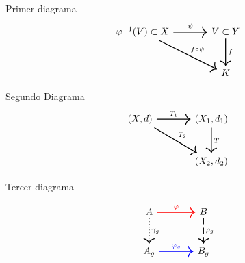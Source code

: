 
Primer diagrama
$$
\begin{tikzcd}[sep= large,every arrow/.append style={line width=0.9pt}]
\varphi^{-1}(V)\subset X \arrow{r}{\psi} \arrow{rd}{f\circ \psi} & V\subset Y \arrow{d}{f}\\ 
& K
\end{tikzcd}
$$

Segundo Diagrama
$$
\begin{tikzcd}[sep= large,every arrow/.append style={line width=0.9pt}]
(X,d)\arrow{r}{T_1} \arrow{dr}{T_2}& (X_1,d_1)\arrow{d}{T}\\
&(X_2,d_2)
\end{tikzcd}
$$

Tercer diagrama

$$
\begin{tikzcd}[sep= large,every arrow/.append style={line width=0.9pt}]
A\arrow[red]{r}{\varphi}\arrow[dotted]{d}{\gamma_g} &B\arrow[dashed]{d}{\rho_g}\\
A_g\arrow[blue]{r}{\varphi_g}&B_g
\end{tikzcd}
$$